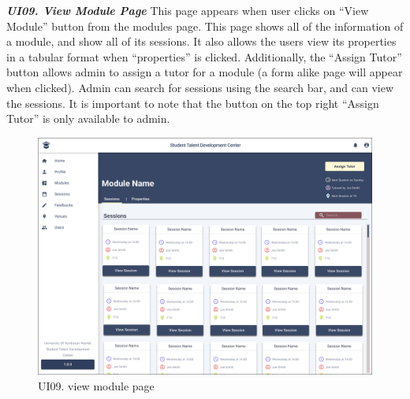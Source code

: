 \begin{justify}
    \noindent\textbf{\textit{UI09. View Module Page}}\newendline
    This page appears when user clicks on “View Module” button from the modules page. This page shows all of the information of a module, and show all of its sessions. It also allows the users view its properties in a tabular format when “properties” is clicked. Additionally, the “Assign Tutor” button allows admin to assign a tutor for a module (a form alike page will appear when clicked). Admin can search for sessions using the search bar, and can view the sessions. It is important to note that the button on the top right “Assign Tutor” is only available to admin.\\

    \begin{figure}[H]
    \centerline{\includegraphics[width=150mm,scale=1]{figures/analysis_and_design/design/UI/9. View Module Page (UI09).png}}
    \caption{UI09. view module page}
    \label{UI09}
    \end{figure}
    \clearpage



\end{justify}
